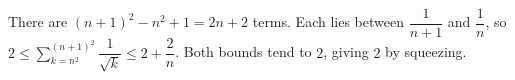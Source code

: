 There are $(n+1)^2-n^2+1=2n+2$ terms. Each lies between $\dfrac{1}{n+1}$ and $\dfrac{1}{n}$, so $2\le\sum_{k=n^2}^{(n+1)^2}\dfrac{1}{\sqrt k}\le2+\dfrac{2}{n}$. Both bounds tend to $2$, giving $\boxed2$ by squeezing.
